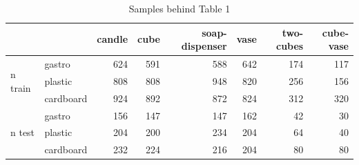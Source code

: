 \begin{table}
\caption{Samples behind Table 1}
\label{tab:id_samples}
\begin{tabular}{llrrrrrr}
\toprule
 &  & candle & cube & soap-dispenser & vase & two-cubes & cube-vase \\
\midrule
\multirow[t]{3}{*}{n train} & gastro & 624 & 591 & 588 & 642 & 174 & 117 \\
 & plastic & 808 & 808 & 948 & 820 & 256 & 156 \\
 & cardboard & 924 & 892 & 872 & 824 & 312 & 320 \\
\multirow[t]{3}{*}{n test} & gastro & 156 & 147 & 147 & 162 & 42 & 30 \\
 & plastic & 204 & 200 & 234 & 204 & 64 & 40 \\
 & cardboard & 232 & 224 & 216 & 204 & 80 & 80 \\
\bottomrule
\end{tabular}
\end{table}
